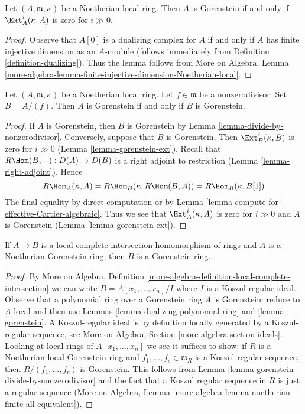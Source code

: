 \begin{lemma}
\label{lemma-gorenstein-ext}
Let $(A, \mathfrak m, \kappa)$ be a Noetherian local ring.
Then $A$ is Gorenstein if and only if $\Ext^i_A(\kappa, A)$
is zero for $i \gg 0$.
\end{lemma}

\begin{proof}
Observe that $A[0]$ is a dualizing complex for $A$ if and only
if $A$ has finite injective dimension as an $A$-module
(follows immediately from Definition \ref{definition-dualizing}).
Thus the lemma follows from More on Algebra, Lemma
\ref{more-algebra-lemma-finite-injective-dimension-Noetherian-local}.
\end{proof}

\begin{lemma}
\label{lemma-gorenstein-divide-by-nonzerodivisor}
Let $(A, \mathfrak m, \kappa)$
be a Noetherian local ring. Let $f \in \mathfrak m$ be a
nonzerodivisor. Set $B = A/(f)$. Then $A$ is Gorenstein if and
only if $B$ is Gorenstein.
\end{lemma}

\begin{proof}
If $A$ is Gorenstein, then $B$ is Gorenstein by
Lemma \ref{lemma-divide-by-nonzerodivisor}.
Conversely, suppose that $B$ is Gorenstein. Then
$\Ext^i_B(\kappa, B)$ is zero for $i \gg 0$
(Lemma \ref{lemma-gorenstein-ext}).
Recall that $R\Hom(B, -) : D(A) \to D(B)$ is a right adjoint
to restriction (Lemma \ref{lemma-right-adjoint}).
Hence
$$
R\Hom_A(\kappa, A) = R\Hom_B(\kappa, R\Hom(B, A)) =
R\Hom_B(\kappa, B[1])
$$
The final equality by direct computation or by
Lemma \ref{lemma-compute-for-effective-Cartier-algebraic}.
Thus we see that $\Ext^i_A(\kappa, A)$ is zero for
$i \gg 0$ and $A$ is Gorenstein (Lemma \ref{lemma-gorenstein-ext}).
\end{proof}

\begin{lemma}
\label{lemma-gorenstein-lci}
If $A \to B$ is a local complete intersection homomorphism of rings and
$A$ is a Noetherian Gorenstein ring, then $B$ is a Gorenstein ring.
\end{lemma}

\begin{proof}
By More on Algebra, Definition
\ref{more-algebra-definition-local-complete-intersection}
we can write $B = A[x_1, \ldots, x_n]/I$
where $I$ is a Koszul-regular ideal. Observe that a polynomial
ring over a Gorenstein ring $A$ is Gorenstein: reduce to
$A$ local and then use Lemmas \ref{lemma-dualizing-polynomial-ring} and
\ref{lemma-gorenstein}.
A Koszul-regular ideal is by definition locally generated
by a Koszul-regular sequence, see More on Algebra, Section
\ref{more-algebra-section-ideals}.
Looking at local rings of $A[x_1, \ldots, x_n]$
we see it suffices to show: if $R$ is a Noetherian local
Gorenstein ring and $f_1, \ldots, f_c \in \mathfrak m_R$
is a Koszul regular sequence, then $R/(f_1, \ldots, f_c)$ is Gorenstein.
This follows from
Lemma \ref{lemma-gorenstein-divide-by-nonzerodivisor} and
the fact that a Koszul regular sequence in $R$ is just a
regular sequence (More on Algebra, Lemma
\ref{more-algebra-lemma-noetherian-finite-all-equivalent}).
\end{proof}

